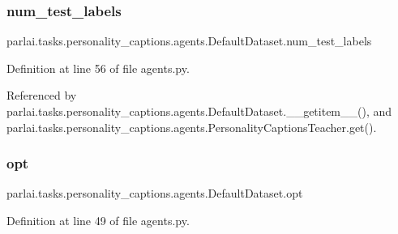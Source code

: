 \subsubsection{\texorpdfstring{num\+\_\+test\+\_\+labels}{num\_test\_labels}}
{\footnotesize\ttfamily parlai.\+tasks.\+personality\+\_\+captions.\+agents.\+Default\+Dataset.\+num\+\_\+test\+\_\+labels}



Definition at line 56 of file agents.\+py.



Referenced by parlai.\+tasks.\+personality\+\_\+captions.\+agents.\+Default\+Dataset.\+\_\+\+\_\+getitem\+\_\+\+\_\+(), and parlai.\+tasks.\+personality\+\_\+captions.\+agents.\+Personality\+Captions\+Teacher.\+get().

\mbox{\label{classparlai_1_1tasks_1_1personality__captions_1_1agents_1_1DefaultDataset_abe6bd53066bf10f26ef80157335cd6b9}} 
\subsubsection{\texorpdfstring{opt}{opt}}
{\footnotesize\ttfamily parlai.\+tasks.\+personality\+\_\+captions.\+agents.\+Default\+Dataset.\+opt}



Definition at line 49 of file agents.\+py.



